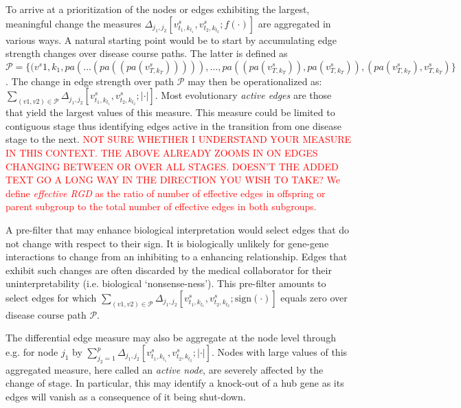 \documentclass[10pt]{article}
\newcommand{\red}[1]{{\textcolor {red} {#1}}}
\begin{document}
To arrive at a prioritization of the nodes or edges exhibiting the largest, meaningful change the measures $\Delta_{j_1,j_2} [v^s_{t_1, k_{t_1}}, v^s_{t_2, k_{t_2}}; f(\cdot)]$ are aggregated in various ways. A natural starting point would be to start by accumulating edge strength changes over disease course paths. The latter is defined as $\mathcal{P} = \{ (v^s{1,k_1}, pa(\ldots (pa((pa(v^s_{T,k_T} ))))), \ldots , pa((pa(v^s_{T,k_T} )), pa(v^s_{T,k_T} )), (pa(v^s_{T,k_T} ), v^s_{T,k_T} ) \}$. The change in edge strength over path $\mathcal{P}$ may then be operationalized as: $\sum_{(v1,v2)\in \mathcal{P}} \Delta_{j_1,j_2} [v^s_{t_1, k_{t_1}}, v^s_{t_2, k_{t_2}}; |\cdot| ]$. Most evolutionary \textit{active edges} are those that yield the largest values of this measure. This measure could be limited to contiguous stage thus identifying edges active in the transition from one disease stage to the next. \red{NOT SURE WHETHER I UNDERSTAND YOUR MEASURE IN THIS CONTEXT. THE ABOVE ALREADY ZOOMS IN ON EDGES CHANGING BETWEEN OR OVER ALL STAGES. DOESN'T THE ADDED TEXT GO A LONG WAY IN THE DIRECTION YOU WISH TO TAKE? We define \textit{effective RGD} as the ratio of number of effective edges in offspring or parent subgroup to the total number of effective edges in both subgroups.}

A pre-filter that may enhance biological interpretation would select edges that do not change with respect to their sign. It is biologically unlikely for gene-gene interactions to change from an inhibiting to a enhancing relationship. Edges that exhibit such changes are often discarded by the medical collaborator for their uninterpretability (i.e. biological `nonsense-ness'). This pre-filter amounts to select edges for which $\sum_{(v1,v2)\in \mathcal{P}} \Delta_{j_1,j_2} [v^s_{t_1, k_{t_1}}, v^s_{t_2, k_{t_2}}; \mbox{sign}(\cdot)]$ equals zero over disease course path $\mathcal{P}$.

The differential edge measure may also be aggregate at the node level through e.g. for node $j_1$ by $\sum_{j_2=1}^p \Delta_{j_1,j_2} [v^s_{t_1, k_{t_1}}, v^s_{t_2, k_{t_2}}; |\cdot|]$. Nodes with large values of this aggregated measure, here called an \textit{active node}, are severely affected by the change of stage. In particular, this may identify a knock-out of a hub gene as its edges will vanish as a consequence of it being shut-down. 
\end{document}
